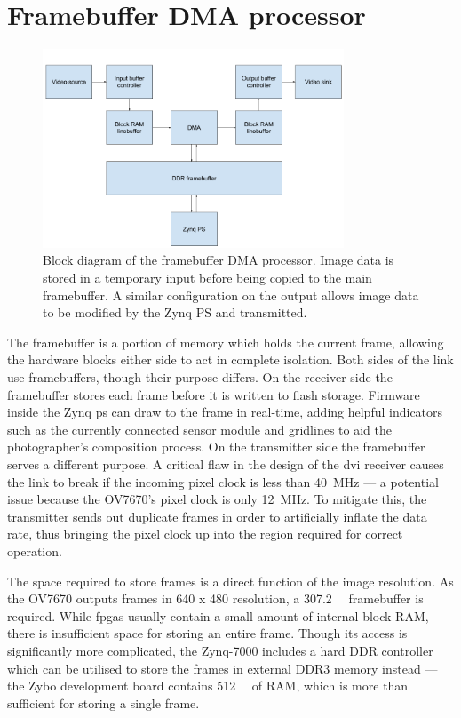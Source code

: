 \section{Framebuffer DMA processor}
\label{sec:framebuffer_dma}

\begin{figure}
  \centering
  \includegraphics[width=0.8\textwidth]{./img/framebuffer_block_diagram.png}
  \caption[Framebuffer DMA block diagram.]{Block diagram of the framebuffer DMA processor. Image data is stored in a temporary input before being copied to the main framebuffer. A similar configuration on the output allows image data to be modified by the Zynq PS and transmitted.}
  \label{fig:framebuffer_block_diagram}
\end{figure}

The framebuffer is a portion of memory which holds the current frame, allowing the hardware blocks either side to act in complete isolation. Both sides of the link use framebuffers, though their purpose differs. On the receiver side the framebuffer stores each frame before it is written to flash storage. Firmware inside the Zynq \gls{ps} can draw to the frame in real-time, adding helpful indicators such as the currently connected sensor module and gridlines to aid the photographer's composition process. On the transmitter side the framebuffer serves a different purpose. A critical flaw in the design of the \gls{dvi} receiver causes the link to break if the incoming pixel clock is less than \SI{40}{\mega\hertz} --- a potential issue because the OV7670's pixel clock is only \SI{12}{\mega\hertz}. To mitigate this, the transmitter sends out duplicate frames in order to artificially inflate the data rate, thus bringing the pixel clock up into the region required for correct operation.

The space required to store frames is a direct function of the image resolution. As the OV7670 outputs frames in 640 x 480 resolution, a \SI{307.2}{\kilo\byte} framebuffer is required. While \glspl{fpga} usually contain a small amount of internal block RAM, there is insufficient space for storing an entire frame. Though its access is significantly more complicated, the Zynq-7000 includes a hard DDR controller which can be utilised to store the frames in external DDR3 memory instead --- the Zybo development board contains \SI{512}{\mega\byte} of RAM, which is more than sufficient for storing a single frame.

